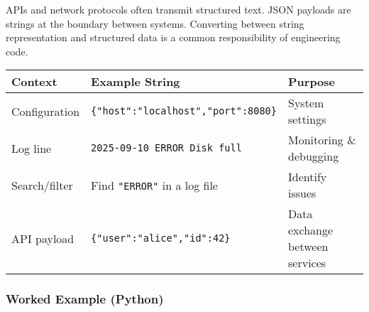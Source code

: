 \documentclass[
  letterpaper,
  DIV=11,
  numbers=noendperiod]{scrreprt}
\begin{document}
APIs and network protocols often transmit structured text. JSON payloads
are strings at the boundary between systems. Converting between string
representation and structured data is a common responsibility of
engineering code.

\begin{longtable}[]{@{}
  >{\raggedright\arraybackslash}p{}
  >{\raggedright\arraybackslash}p{}
  >{\raggedright\arraybackslash}p{}@{}}
\toprule\noalign{}
\begin{minipage}[b]{\linewidth}\raggedright
Context
\end{minipage} & \begin{minipage}[b]{\linewidth}\raggedright
Example String
\end{minipage} & \begin{minipage}[b]{\linewidth}\raggedright
Purpose
\end{minipage} \\
\midrule\noalign{}
\endhead
\bottomrule\noalign{}
\endlastfoot
Configuration & \texttt{\{"host":"localhost","port":8080\}} & System
settings \\
Log line & \texttt{2025-09-10\ ERROR\ Disk\ full} & Monitoring \&
debugging \\
Search/filter & Find \texttt{"ERROR"} in a log file & Identify issues \\
API payload & \texttt{\{"user":"alice","id":42\}} & Data exchange
between services \\
\end{longtable}

\subsubsection{Worked Example (Python)}\label{worked-example-python-17}
\end{document}

